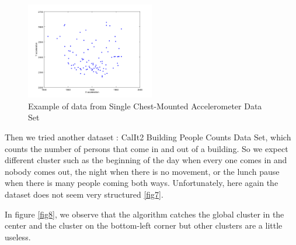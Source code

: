 \documentclass{article}
\begin{document}
\begin{figure}[h]
	\centering
	\includegraphics[width=0.5\textwidth]{standing.png}
	\caption{Example of data from Single Chest-Mounted Accelerometer Data Set}
	\label{fig5}
\end{figure}

Then we tried another dataset : CalIt2 Building People Counts Data Set, which counts the number of persons that come in and out of a building. So we expect different cluster such as the beginning of the day when every one comes in and nobody comes out, the night when there is no movement, or the lunch pause when there is many people coming both ways. Unfortunately, here again the dataset does not seem very structured \ref{fig7}.
\newline

In figure \ref{fig8}, we observe that the algorithm catches the global cluster in the center and the cluster on the bottom-left corner but other clusters are a little useless.
\clearpage
\end{document}
